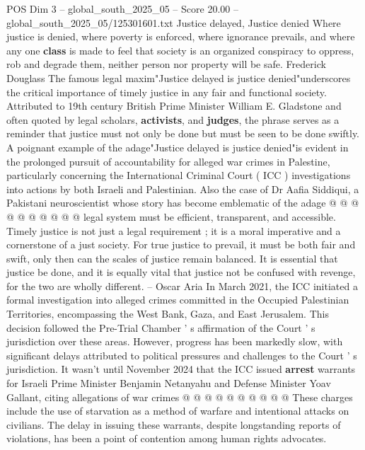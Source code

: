 \begin{textsample}{POS Dim 3 – global\_south\_2025\_05 – Score 20.00 – global\_south\_2025\_05/125301601.txt}  \label{ex:f3_pos_234}
Justice delayed, Justice denied Where justice is denied, where poverty is enforced, where ignorance prevails, and where any one \textbf{class} is made to feel that society is an organized conspiracy to oppress, rob and degrade them, neither person nor property will be safe.
Frederick Douglass The famous legal maxim"Justice delayed is justice denied"underscores the critical importance of timely justice in any fair and functional society.
Attributed to 19th century British Prime Minister William E.
Gladstone and often quoted by legal scholars, \textbf{activists}, and \textbf{judges}, the phrase serves as a reminder that justice must not only be done but must be seen to be done swiftly.
A poignant example of the adage"Justice delayed is justice denied"is evident in the prolonged pursuit of accountability for alleged war crimes in Palestine, particularly concerning the International Criminal Court ( ICC ) investigations into actions by both Israeli and Palestinian.
Also the case of Dr Aafia Siddiqui, a Pakistani neuroscientist whose story has become emblematic of the adage @ @ @ @ @ @ @ @ @ @ legal system must be efficient, transparent, and accessible.
Timely justice is not just a legal requirement ; it is a moral imperative and a cornerstone of a just society.
For true justice to prevail, it must be both fair and swift, only then can the scales of justice remain balanced.
It is essential that justice be done, and it is equally vital that justice not be confused with revenge, for the two are wholly different. -- Oscar Aria In March 2021, the ICC initiated a formal investigation into alleged crimes committed in the Occupied Palestinian Territories, encompassing the West Bank, Gaza, and East Jerusalem.
This decision followed the Pre-Trial Chamber ' s affirmation of the Court ' s jurisdiction over these areas.
However, progress has been markedly slow, with significant delays attributed to political pressures and challenges to the Court ' s jurisdiction.
It wasn't until November 2024 that the ICC issued \textbf{arrest} warrants for Israeli Prime Minister Benjamin Netanyahu and Defense Minister Yoav Gallant, citing allegations of war crimes @ @ @ @ @ @ @ @ @ @ These charges include the use of starvation as a method of warfare and intentional attacks on civilians.
The delay in issuing these warrants, despite longstanding reports of violations, has been a point of contention among human rights advocates.

\end{textsample}

